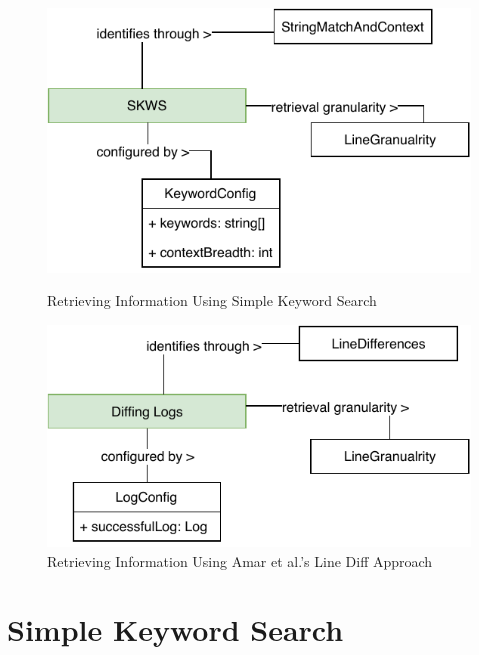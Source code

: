 \documentclass[\myrootdir/main.tex]{subfiles}
\begin{document}

\begin{figure}[htbp]
	\centering
	\begin{minipage}{0.45\textwidth}
		\centering
		\includegraphics[width=\textwidth, clip]{img/skws-technique.pdf}
		\caption{Retrieving Information Using Simple Keyword Search}
		\label{fig:keyword-search-explanation}
	\end{minipage}\hfill
	\begin{minipage}{0.45\textwidth}
		\centering
		\includegraphics[width=\textwidth, clip]{img/diff-technique.pdf}
		\caption{Retrieving Information Using Amar et al.'s Line Diff Approach}
		\label{fig:diff-technique-model}
	\end{minipage}
\end{figure}

\section{Simple Keyword Search}
\label{sec:expl-skws}
\end{document}
